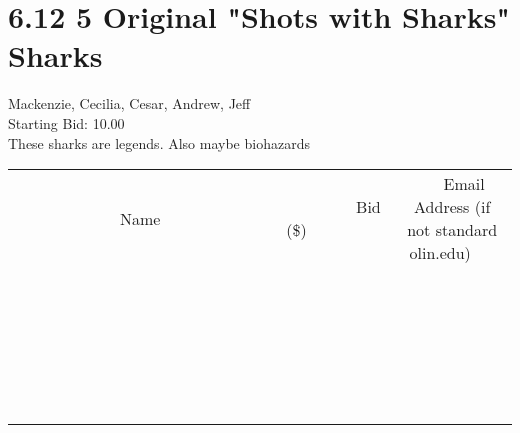 \documentclass[11pt]{article}
\begin{document}
					\section*{6.12 5 Original "Shots with Sharks" Sharks}
					Mackenzie, Cecilia, Cesar, Andrew, Jeff \\
					Starting Bid: 10.00 \\
					These sharks are legends. Also maybe biohazards \\
					[6ex]
					\begin{tabular}{c c c}
						~~~~~~~~~~~~~Name~~~~~~~~~~~~~ & ~~~~~~~~~Bid (\$)~~~~~~~~~ & ~~~Email Address (if not standard olin.edu)~~~ \\
				
 & & \\
\hline
 & & \\
\hline
 & & \\
\hline
 & & \\
\hline
 & & \\
\hline
 & & \\
\hline
 & & \\
\hline
 & & \\
\hline
 & & \\
\hline
 & & \\
\hline
 & & \\
\hline
 & & \\
\hline
 & & \\
\hline
 & & \\
\hline
 & & \\
\hline
 & & \\
\hline
 & & \\
\hline
 & & \\
\hline
 & & \\
\hline
 & & \\
\hline
 & & \\
\hline
 & & \\
\hline
 & & \\
\hline
 & & \\
\hline
 & & \\
\hline
 & & \\
\hline
					\end{tabular}
					\clearpage
				
\end{document}
